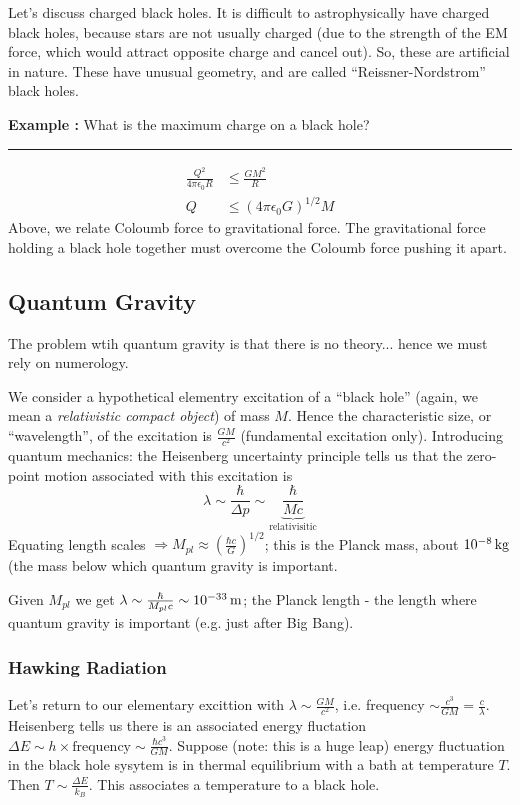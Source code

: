 \documentclass[a4paper]{article} %
\newcommand{\example}[2]
{
\begin{framed}
\textbf{Example #1:} #2
\end{framed}
}
\begin{document}
Let's discuss charged black holes. It is difficult to astrophysically have charged black holes, because stars are not usually charged (due to the strength of the EM force, which would attract opposite charge and cancel out). So, these are artificial in nature. These have unusual geometry, and are called ``Reissner-Nordstrom'' black holes.
\example{}{What is the maximum charge on a black hole?\\\hrule
\begin{align*}
\frac{Q^2}{4\pi\epsilon_0 R}&\leq \frac{GM^2}{R}\\
Q&\leq (4\pi\epsilon_0 G)^{1/2} M
\end{align*}
Above, we relate Coloumb force to gravitational force. The gravitational force holding a black hole together must overcome the Coloumb force pushing it apart.
}

\subsection{Quantum Gravity}
The problem wtih quantum gravity is that there is no theory... hence we must rely on numerology.

We consider a hypothetical elementry excitation of a ``black hole'' (again, we mean a \emph{relativistic compact object}) of mass $M$. Hence the characteristic size, or ``wavelength'', of the excitation is $\frac{GM}{c^2}$ (fundamental excitation only). Introducing quantum mechanics: the Heisenberg uncertainty principle tells us that the zero-point motion associated with this excitation is
\begin{equation}
\lambda\sim\frac{\hbar}{\Delta p}\sim \underbrace{\frac{\hbar}{Mc}}_{\text{relativisitic}}
\end{equation}
Equating length scales $\Rightarrow M_{pl}\approx \left(\frac{\hbar c}{G}\right)^{1/2}$; this is the Planck mass, about $\SI{d-8}{kg}$ (the mass below which quantum gravity is important. 

Given $M_{pl}$ we get $\lambda\sim\frac{\hbar}{M_{pl}c}\sim \SI{d-33}{m}$; the Planck length - the length where quantum gravity is important (e.g. just after Big Bang).

\subsubsection{Hawking Radiation}
Let's return to our elementary excittion with $\lambda\sim\frac{GM}{c^2}$, i.e. frequency $\sim \frac{c^3}{GM}=\frac{c}{\lambda}$. Heisenberg tells us there is an associated energy fluctation $\Delta E\sim h\times\text{frequency}\sim\frac{\hbar c^3}{GM}$. Suppose (note: this is a huge leap) energy fluctuation in the black hole sysytem is in thermal equilibrium with a bath at temperature $T$. Then $T\sim\frac{\Delta E}{k_B}$. This associates a temperature to a black hole.
\end{document}
